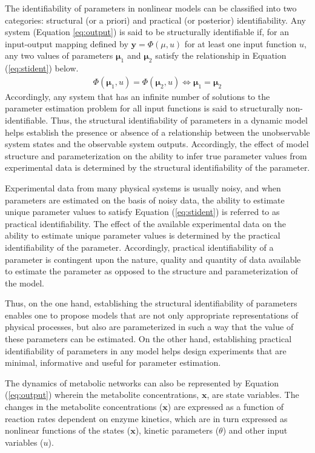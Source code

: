 \documentclass[10pt]{article}
\begin{document}
The identifiability of parameters in nonlinear models can be classified into two categories: structural (or a priori) and practical (or posterior) identifiability. 	
Any system (Equation \ref{eq:output}) is said to be structurally identifiable if, for an input-output mapping defined by $\mathbf{y} = \Phi(\mu,u)$ for at least one input function $u$, any two values of parameters $\mathbf{\mu}_1$ and $\mathbf{\mu}_2$ satisfy the relationship in Equation (\ref{eq:stident}) below.
\begin{align}\label{eq:stident}
\Phi(\mathbf{\mu}_1,u) = \Phi(\mathbf{\mu}_2,u) \iff \mathbf{\mu}_1 = \mathbf{\mu}_2
\end{align}
Accordingly, any system that has an infinite number of solutions to the parameter estimation problem for all input functions is said to structurally non-identifiable. Thus, the structural identifiability of parameters in a dynamic model helps establish the presence or absence of a relationship between the unobservable system states and the observable system outputs. Accordingly, the effect of model structure and parameterization on the ability to infer true parameter values from experimental data is determined by the structural identifiability of the parameter. 

Experimental data from many physical systems is usually noisy, and when parameters are estimated on the basis of noisy data, the ability to estimate unique parameter values to satisfy Equation (\ref{eq:stident}) is referred to as practical identifiability. The effect of the available experimental data on the ability to estimate unique parameter values is determined by the practical identifiability of the parameter. Accordingly, practical identifiability of a parameter is contingent upon the nature, quality and quantity of data available to estimate the parameter as opposed to the structure and parameterization of the model. 

Thus, on the one hand, establishing the structural identifiability of parameters enables one to propose models that are not only appropriate representations of physical processes, but also are parameterized in such a way that the value of these parameters can be estimated. On the other hand, establishing practical identifiability of parameters in any model helps design experiments that are minimal, informative and useful for parameter estimation.

The dynamics of metabolic networks can also be represented by Equation (\ref{eq:output}) wherein the metabolite concentrations, $\mathbf{x}$, are state variables. The changes in the metabolite concentrations ($\mathbf{x}$) are expressed as a function of reaction rates dependent on enzyme kinetics, which are in turn expressed as nonlinear functions of the states ($\mathbf{x}$), kinetic parameters ($\theta$) and other input variables ($u$). 
\end{document}
